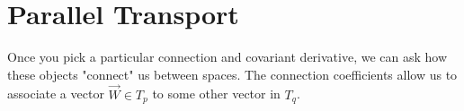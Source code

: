 \documentclass[10pt]{article}
\begin{document}
    \section{Parallel Transport}
        Once you pick a particular connection and covariant derivative, we can ask how these objects "connect" us between spaces. The connection coefficients allow us to associate a vector $\vec{W} \in T_p$ to some other vector in $T_q$.
       
    
   \begin{figure}
       \begin{center}


                
                \begin{tikzpicture}[x=0.75pt,y=0.75pt,yscale=-1,xscale=1]
                

\end{tikzpicture}
\end{center}
\end{figure}
\end{document}
